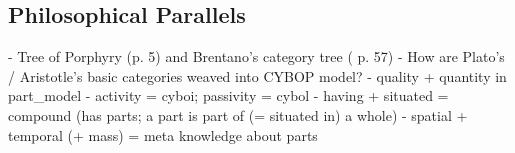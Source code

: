 %
%
%
%
%
%
%

\subsection{Philosophical Parallels}
\label{philosophical_parallels_heading}

- Tree of Porphyry (p. 5) and Brentano's category tree (\cite{sowa} p. 57)
- How are Plato's / Aristotle's basic categories weaved into CYBOP model?
  - quality + quantity in part\_model
  - activity = cyboi; passivity = cybol
  - having + situated = compound (has parts; a part is part of (= situated in) a whole)
  - spatial + temporal (+ mass) = meta knowledge about parts

